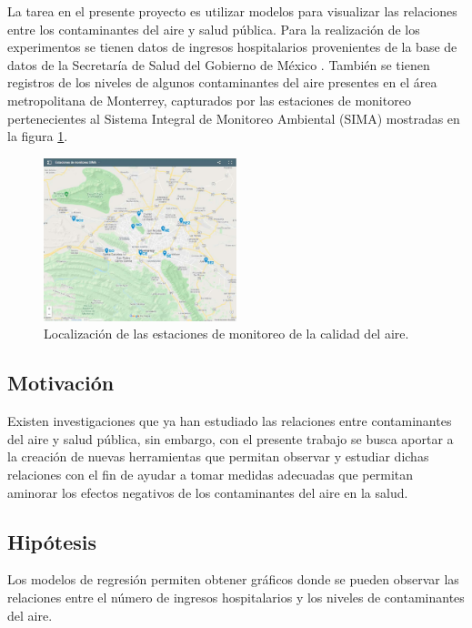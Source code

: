 \documentclass[3p,times]{elsarticle}
\begin{document}
La tarea en el presente proyecto es utilizar modelos para visualizar las relaciones entre los contaminantes del aire y salud pública. Para la realización de los experimentos se tienen datos de ingresos hospitalarios provenientes de la base de datos de la Secretaría de Salud del Gobierno de México \cite{f1}. También se tienen registros de los niveles de algunos contaminantes del aire presentes en el área metropolitana de Monterrey, capturados por las estaciones de monitoreo pertenecientes al Sistema Integral de Monitoreo Ambiental (SIMA) \cite{f2} mostradas en la figura \ref{estaciones}.

\begin{figure}[h!]
\setcounter{figure}{0} %
\begin{center}
   \includegraphics[trim=50 50 50 50,clip,width=0.5\textwidth]{mapa_estaciones.eps}
   \end{center}
    \caption{Localización de las estaciones de monitoreo de la calidad del aire.}
    \label{estaciones}
\end{figure}

\subsection{Motivación}
Existen investigaciones que ya han estudiado las relaciones entre contaminantes del aire y salud pública, sin embargo, con el presente trabajo se busca aportar a la creación de nuevas herramientas que permitan observar y estudiar dichas relaciones con el fin de ayudar a tomar medidas adecuadas que permitan aminorar los efectos negativos de los contaminantes del aire en la salud.

\subsection{Hipótesis}
Los modelos de regresión permiten obtener gráficos donde se pueden observar las relaciones entre el número de ingresos hospitalarios y los niveles de contaminantes del aire.
\end{document}
